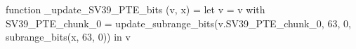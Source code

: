 function _update_SV39_PTE_bits (v, x) = let v = { v with SV39_PTE_chunk_0 = update_subrange_bits(v.SV39_PTE_chunk_0, 63, 0, subrange_bits(x, 63, 0)) } in
  v
